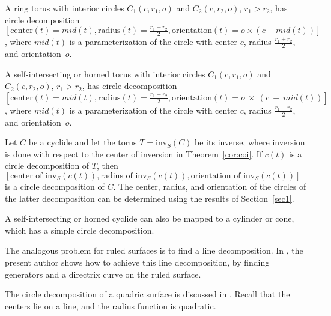 \begin{lemma}
A ring torus with interior circles $C_1(c,r_1,o)$ and 
$C_2(c,r_2,o)$, $r_1 > r_2$, has circle decomposition 
$[\mbox{center}(t) = mid(t),
 \mbox{radius}(t) = \frac{r_1 - r_2}{2},
 \mbox{orientation}(t) = o \times (c - mid(t))]$,
where $mid(t)$ is a parameterization of the circle with center $c$,
radius $\frac{r_1+r_2}{2}$, and orientation~$o$.

A self-intersecting or horned torus with interior circles $C_1(c,r_1,o)$ and 
$C_2(c,r_2,o)$, $r_1 > r_2$, has circle decomposition 
$[\mbox{center}(t) = mid(t),
 \mbox{radius}(t) = \frac{r_1 + r_2}{2},
 \mbox{orientation}(t) = o~\times~(c~-~mid(t))]$,
where $mid(t)$ is a parameterization of the circle with center $c$,
radius $\frac{r_1-r_2}{2}$, and orientation~$o$.
\end{lemma}

\begin{lemma}
Let $C$ be a cyclide and let the torus $T = \mbox{inv}_S(C)$ be its inverse,
where inversion is done with respect
to the center of inversion in Theorem~\ref{cor:coi}.
If $c(t)$ is a circle decomposition of $T$,
then $[\mbox{center of inv}_S(c(t)),\mbox{radius of inv}_S(c(t)),
\mbox{orientation of inv}_S(c(t))]$ is a circle decomposition of $C$.
The center, radius, and orientation of the circles of the latter decomposition
can be determined using the results of Section~\ref{sec1}.
\end{lemma}

\begin{rmk}
A self-intersecting or horned cyclide can also be mapped to a cylinder or
cone, which has a simple circle decomposition.
\end{rmk}

\begin{rmk}
The analogous problem for ruled surfaces is to find a line decomposition.
In \cite{jj91ru}, the present author shows how to achieve this line 
decomposition, by finding generators and a directrix curve on the 
ruled surface.
\end{rmk}

\begin{rmk}
The circle decomposition of a quadric surface is discussed in \cite{JS90u}.
Recall that the centers lie on a line, and the radius function is quadratic.
\end{rmk}


